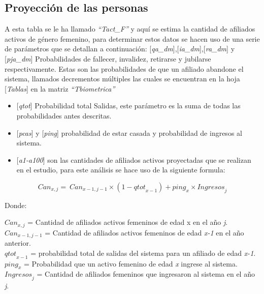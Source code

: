 \documentclass[
  letterpaper,
  DIV=11,
  numbers=noendperiod]{scrreprt}
\providecommand{\tightlist}{%
  \setlength{\itemsep}{0pt}\setlength{\parskip}{0pt}}\usepackage{longtable,booktabs,array}
\begin{document}
\hypertarget{proyecciuxf3n-de-las-personas}{%
\subsection{Proyección de las
personas}\label{proyecciuxf3n-de-las-personas}}

A esta tabla se le ha llamado \emph{``Tact\_F''} y aquí se estima la
cantidad de afiliados activos de género femenino, para determinar estos
datos se hacen uso de una serie de parámetros que se detallan a
continuación:
{[}\emph{qa\_dm}{]},{[}\emph{ia\_dm}{]},{[}\emph{ra\_dm}{]} y
{[}\emph{pja\_dm}{]} Probabilidades de fallecer, invalidez, retirarse y
jubilarse respectivamente. Estas son las probabilidades de que un
afiliado abandone el sistema, llamados decrementos múltiples las cuales
se encuentran en la hoja {[}\emph{Tablas}{]} en la matriz
\emph{``Tbiometrica''}

\begin{itemize}
\tightlist
\item
  {[}\emph{qtot}{]} Probabilidad total Salidas, este parámetro es la
  suma de todas las probabilidades antes descritas.
\item
  {[}\emph{pcas}{]} y {[}\emph{ping}{]} probabilidad de estar casada y
  probabilidad de ingresos al sistema.
\item
  {[}\emph{a1-a100}{]} son las cantidades de afiliados activos
  proyectadas que se realizan en el estudio, para este análisis se hace
  uso de la siguiente formula:
\end{itemize}

\begin{equation} 
{Can}_{x,j}=\ {Can}_{x-1,j-1}\times\left(1-{qtot}_{x-1}\right)+{ping}_x\times{Ingresos}_j
 \label{eq:canactivos}
\end{equation}

Donde:

\(Can_{x,j}\) = Cantidad de afiliados activos femeninos de edad x en el
año \emph{j}.\\
\(Can_{x-1,j-1}\) = Cantidad de afiliados activos femeninos de edad
\emph{x-1} en el año anterior.\\
\({qtot}_{x-1}\) = probabilidad total de salidas del sistema para un
afiliado de edad \emph{x-1}.\\
\({ping}_x\) = Probabilidad que un activo femenino de edad \emph{x}
ingrese al sistema.\\
\({Ingresos}_j\) = Cantidad de afiliados femeninos que ingresaron al
sistema en el año \emph{j}.
\end{document}
